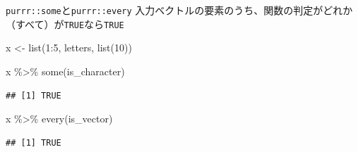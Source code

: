 \documentclass[
  ignorenonframetext,
  aspectratio=169]{beamer}
\newenvironment{Shaded}{\begin{snugshade}}{\end{snugshade}}
\newcommand{\DecValTok}[1]{\textcolor[rgb]{0.00,0.00,0.81}{#1}}
\newcommand{\FunctionTok}[1]{\textcolor[rgb]{0.00,0.00,0.00}{#1}}
\newcommand{\NormalTok}[1]{#1}
\newcommand{\OtherTok}[1]{\textcolor[rgb]{0.56,0.35,0.01}{#1}}
\newcommand{\SpecialCharTok}[1]{\textcolor[rgb]{0.00,0.00,0.00}{#1}}
\begin{document}
\begin{frame}[fragile]{\texttt{purrr::some}と\texttt{purrr::every}}
\protect\hypertarget{purrrsomeux3068purrrevery}{}
入力ベクトルの要素のうち、関数の判定がどれか（すべて）が\texttt{TRUE}なら\texttt{TRUE}

\begin{Shaded}
\begin{Highlighting}[]
\NormalTok{x }\OtherTok{\textless{}{-}} \FunctionTok{list}\NormalTok{(}\DecValTok{1}\SpecialCharTok{:}\DecValTok{5}\NormalTok{, letters, }\FunctionTok{list}\NormalTok{(}\DecValTok{10}\NormalTok{))}

\NormalTok{x }\SpecialCharTok{\%\textgreater{}\%} \FunctionTok{some}\NormalTok{(is\_character)}
\end{Highlighting}
\end{Shaded}

\begin{verbatim}
## [1] TRUE
\end{verbatim}

\begin{Shaded}
\begin{Highlighting}[]
\NormalTok{x }\SpecialCharTok{\%\textgreater{}\%} \FunctionTok{every}\NormalTok{(is\_vector)}
\end{Highlighting}
\end{Shaded}

\begin{verbatim}
## [1] TRUE
\end{verbatim}
\end{frame}
\end{document}
